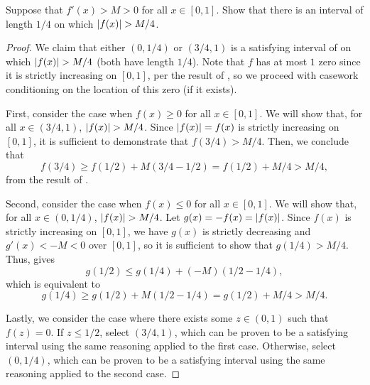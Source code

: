 \begin{problem}
  Suppose that $f'(x) > M > 0$ for all $x \in [0,1]$. Show that there is an
  interval of length $1/4$ on which $\left\lvert f(x) \right\rvert > M/4$. 

  \begin{proof}
    We claim that either $(0, 1/4)$ or $(3/4, 1)$ is a satisfying interval of
    on which $\left\lvert f(x) \right\rvert > M/4$ (both have length $1/4$). Note that $f$ has at
    most $1$ zero since it is strictly increasing on $[0, 1]$, per the result of
    , so we proceed with
    casework conditioning on the location of this zero (if it exists).

    First, consider the case when $f(x) \geq 0$ for all $x \in [0, 1]$. We will show that, for all 
    $x \in (3/4, 1)$, $\left\lvert f(x) \right\rvert > M/4$. Since $\left\lvert f(x) \right\rvert = f(x)$ is strictly increasing on $[0, 1]$, 
    it is sufficient to demonstrate that $f(3/4) > M/4$. Then, we conclude that
    \[
      f(3/4) \geq f(1/2) + M(3/4 - 1/2) = f(1/2) + M/4 > M/4,
    \]
    from the result of .

    Second, consider the case when $f(x) \leq 0$ for all $x \in [0, 1]$. We
    will show that, for all $x \in (0, 1/4)$, $\left\lvert f(x) \right\rvert > M/4$.
    Let $g(x) = -f(x) = \left\lvert f(x) \right\rvert$. Since $f(x)$ is strictly increasing on $[0, 1]$, we
    have $g(x)$ is strictly decreasing and $g'(x) < -M < 0$ over $[0, 1]$, so
    it is sufficient to show that $g(1/4) > M/4$. Thus,  
     gives
    \[
      g(1/2) \leq g(1/4) + (-M)(1/2 - 1/4),
    \]
    which is equivalent to
    \[
      g(1/4) \geq g(1/2) + M(1/2 - 1/4) = g(1/2) + M/4 > M/4.
    \]

    Lastly, we consider the case where there exists some $z \in (0, 1)$ such
    that $f(z) = 0$. If $z \leq 1/2$, select $(3/4, 1)$, which can be proven to
    be a satisfying interval using the same reasoning applied to the first
    case. Otherwise, select $(0, 1/4)$, which can be proven to be a satisfying
    interval using the same reasoning applied to the second case.
  \end{proof}
\end{problem}

